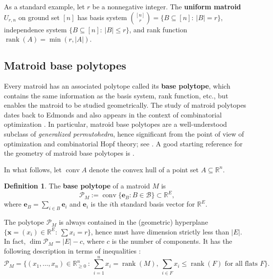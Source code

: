 \documentclass[11pt]{amsart}
\theoremstyle{definition}
\newtheorem{definition}[theorem]{Definition}
\newcommand{\0}{\emptyset}
\DeclareMathOperator{\conv}{conv}
\newcommand{\R}{\mathbb{R}}
\newcommand{\ee}{\mathbf{e}}
\newcommand{\bx}{\mathbf{x}}
\newcommand{\B}{\mathcal{B}}
\newcommand{\Po}{\mathcal{P}}
\newcommand{\defterm}[1]{\textbf{#1}}
\DeclareMathOperator{\rank}{\operatorname{rank}}
\begin{document}
As a standard example, let $r$ be a nonnegative integer.
The \defterm{uniform matroid} $U_{r,n}$ on ground set $[n]$ has basis system $\binom{[n]}{r}=\{B\subseteq [n]:\ |B|=r\}$, independence system $\{B\subseteq[n]:\ |B|\leq r\}$, and rank function $\rank(A)=\min(r,|A|)$.


\subsection{Matroid base polytopes}\label{subsec:matroid_base_polys}
Every matroid has an associated polytope called its \defterm{base polytope}, which contains the same information as the basis system, rank function, etc., but enables the matroid to be studied geometrically.
The study of matroid polytopes dates back to Edmonds \cite{Edmonds} and also appears in the context of combinatorial optimization \cite{CookCunninghamPulleyblankSchrivjer, Fujishige}.
In particular, matroid base polytopes are a well-understood subclass of \textit{generalized permutohedra}, hence significant from the point of view of optimization and combinatorial Hopf theory; see
\cite{Fujishige,AguiarArdila,PRW,GGMS}.
A good starting reference for the geometry of matroid base polytopes is \cite[Sec.~2]{FeichtnerSturmfels}.

In what follows, let $ \conv A $ denote the convex hull of a point set $A\subseteq\R^n$.

\begin{definition} \label{def:matroid_polytopes}
The \textbf{base polytope} of a matroid $M$ is \[\Po_M:=\conv\{\ee_B: B\in\B\} \subset \R^{E},\] where $\displaystyle \ee_B=\sum_{i\in B}\ee_i$ and $\ee_i$ is the $i$th standard basis vector for $\R^E$.
\end{definition}
The polytope $\Po_M$ is always contained in the (geometric) hyperplane $\{\bx=(x_i)\in\R^E:\ \sum x_i=r\}$, hence must have dimension strictly less than $|E|$.
In fact, $\dim\Po_M=|E|-c$, where $c$ is the number of components.
It has the following description in terms of inequalities \cite[Prop.~2.3]{FeichtnerSturmfels}:
\begin{equation}\label{feichtner}
\Po_M=\bigg\{(x_1,\dots, x_n)\in \R_{\geq0}^n\ :\ \sum_{i=1}^n x_i = \rank(M),\ \sum_{i\in F} x_i \leq \rank(F) \textrm{ for all flats } F\bigg\}.
\end{equation}
\end{document}
